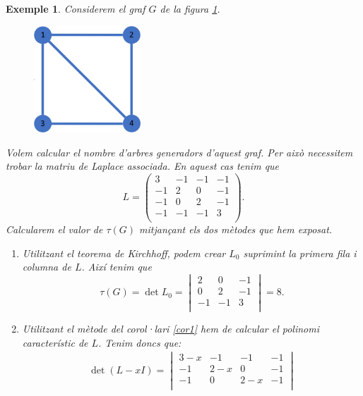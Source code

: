 \documentclass{article}
\newtheorem{example}{Exemple}[section]
\begin{document}
\begin{example}
    Considerem el graf $G$ de la figura \ref{graf1}.
    \begin{figure}[H]
        \centering
        \includegraphics[width=4cm]{Imatges/graf1.jpg}
        \label{graf1}
    \end{figure}
    Volem calcular el nombre d'arbres generadors d'aquest graf. Per això necessitem trobar la matriu de Laplace associada. En aquest cas tenim que $$L=\begin{pmatrix}
            3  & -1 & -1 & -1 \\
            -1 & 2  & 0  & -1 \\
            -1 & 0  & 2  & -1 \\
            -1 & -1 & -1 & 3  \\
        \end{pmatrix}.$$
    Calcularem el valor de $\tau(G)$ mitjançant els dos mètodes que hem exposat.
    \begin{enumerate}
        \item Utilitzant el teorema de Kirchhoff, podem crear $L_0$ suprimint la primera fila i columna de $L$. Així tenim que $$\tau(G)=\det L_0=\begin{vmatrix}
                      2  & 0  & -1 \\
                      0  & 2  & -1 \\
                      -1 & -1 & 3  \\
                  \end{vmatrix}=8.$$
        \item Utilitzant el mètode del corol·lari \ref{cor1} hem de calcular el polinomi característic de $L$. Tenim doncs que:
              \begin{multline*}
                  \det(L-xI)=\begin{vmatrix}
                      3-x & -1  & -1  & -1  \\
                      -1  & 2-x & 0   & -1  \\
                      -1  & 0   & 2-x & -1  \\

\end{vmatrix}
\end{multline*}
\end{enumerate}
\end{example}
\end{document}

